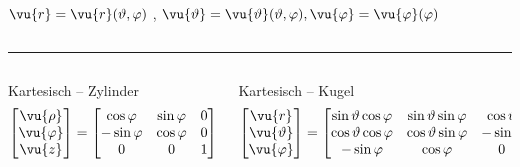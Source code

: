 \begin{frame}
\begin{columns}[t]
\begin{column}{.33\linewidth}
$\vu{r}=\vu{r}(\vartheta, \varphi)$ , $\vu{\vartheta}=\vu{\vartheta}(\vartheta,\varphi), \vu{\varphi}=\vu{\varphi}(\varphi)$

\end{column}
\end{columns}
\pause

\rule[1ex]{\linewidth}{1pt}

\begin{columns}[t]
  \begin{column}{.45\linewidth}
    \alert{Kartesisch -- Zylinder}
    \begin{equation*}
    \begin{bmatrix}
      \vu{\rho}\\
      \vu{\varphi}\\
      \vu{z}
    \end{bmatrix}
    =
    \begin{bmatrix}
      \cos\varphi & \sin\varphi & 0\\
      -\sin\varphi & \cos\varphi & 0\\
      0 & 0 & 1
    \end{bmatrix}
    \begin{bmatrix}
      \vu{x}\\
      \vu{y}\\
      \vu{z}
    \end{bmatrix}    
    \end{equation*}
    \end{column}
    \begin{column}{.52\linewidth}
      \alert{Kartesisch -- Kugel}
    \begin{equation*}
    \begin{bmatrix}
      \vu{r}\\
      \vu{\vartheta}\\
      \vu{\varphi}
    \end{bmatrix}
    =
    \begin{bmatrix}
      \sin\vartheta\cos\varphi & \sin\vartheta\sin\varphi & \cos\vartheta\\
      \cos\vartheta\cos\varphi & \cos\vartheta\sin\varphi & - \sin\vartheta\\
      -\sin\varphi & \cos\varphi & 0
    \end{bmatrix}
    \begin{bmatrix}
      \vu{x}\\
      \vu{y}\\
      \vu{z}
    \end{bmatrix}    
    \end{equation*}


\end{column}
\end{columns}
\end{frame}
